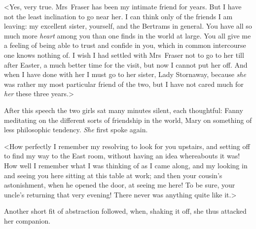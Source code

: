 <Yes, very true. Mrs~Fraser has been my intimate friend for years. But I have not the least inclination to go near her. I can think only of the friends I am leaving: my excellent sister, yourself, and the Bertrams in general. You have all so much more \textit{heart}  among you than one finds in the world at large. You all give me a feeling of being able to trust and confide in you, which in common intercourse one knows nothing of. I wish I had settled with Mrs~Fraser not to go to her till after Easter, a much better time for the visit, but now I cannot put her off. And when I have done with her I must go to her sister, Lady Stornaway, because \textit{she}  was rather my most particular friend of the two, but I have not cared much for \textit{her}  these three years.>

After this speech the two girls sat many minutes silent, each thoughtful: Fanny meditating on the different sorts of friendship in the world, Mary on something of less philosophic tendency. \textit{She}  first spoke again.

<How perfectly I remember my resolving to look for you upstairs, and setting off to find my way to the East room, without having an idea whereabouts it was! How well I remember what I was thinking of as I came along, and my looking in and seeing you here sitting at this table at work; and then your cousin's astonishment, when he opened the door, at seeing me here! To be sure, your uncle's returning that very evening! There never was anything quite like it.>

Another short fit of abstraction followed, when, shaking it off, she thus attacked her companion.

